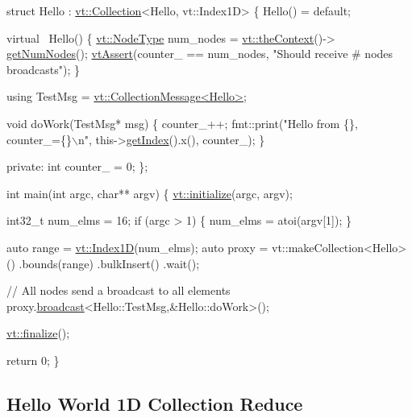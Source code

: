 \begin{DoxyCodeInclude}
\textcolor{keyword}{struct }Hello : \hyperlink{structvt_1_1vrt_1_1collection_1_1_collection}{vt::Collection}<Hello, vt::Index1D> \{
  Hello() = \textcolor{keywordflow}{default};

  \textcolor{keyword}{virtual} ~Hello() \{
    \hyperlink{namespacevt_a866da9d0efc19c0a1ce79e9e492f47e2}{vt::NodeType} num\_nodes = \hyperlink{namespacevt_a26551fe0e6e6a1371111df5b12c7e92c}{vt::theContext}()->
      \hyperlink{structvt_1_1ctx_1_1_context_a7f41071aadf6d5fa9e1b6c703c5ff19d}{getNumNodes}();
    \hyperlink{config__assert_8h_aeddd4990a496e91a0ca5d6c16437359b}{vtAssert}(counter\_ == num\_nodes, \textcolor{stringliteral}{"Should receive # nodes broadcasts"});
  \}

  \textcolor{keyword}{using} TestMsg = \hyperlink{structvt_1_1vrt_1_1collection_1_1_collection_message}{vt::CollectionMessage<Hello>};

  \textcolor{keywordtype}{void} doWork(TestMsg* msg) \{
    counter\_++;
    fmt::print(\textcolor{stringliteral}{"Hello from \{\}, counter\_=\{\}\(\backslash\)n"}, this->\hyperlink{structvt_1_1vrt_1_1collection_1_1_indexable_a28d05f23e7a20e12e94b8235305c1e82}{getIndex}().x(), counter\_);
  \}

\textcolor{keyword}{private}:
  \textcolor{keywordtype}{int} counter\_ = 0;
\};

\textcolor{keywordtype}{int} main(\textcolor{keywordtype}{int} argc, \textcolor{keywordtype}{char}** argv) \{
  \hyperlink{namespacevt_aae6ab5af3e11886ce73c4c3ffa008201}{vt::initialize}(argc, argv);

  int32\_t num\_elms = 16;
  \textcolor{keywordflow}{if} (argc > 1) \{
    num\_elms = atoi(argv[1]);
  \}

  \textcolor{keyword}{auto} range = \hyperlink{namespacevt_a5540efc78234273e1796fb003fe4d234}{vt::Index1D}(num\_elms);
  \textcolor{keyword}{auto} proxy = vt::makeCollection<Hello>()
    .bounds(range)
    .bulkInsert()
    .wait();

  \textcolor{comment}{// All nodes send a broadcast to all elements}
  proxy.\hyperlink{structvt_1_1objgroup_1_1proxy_1_1_proxy_a0b716ca776b1f06e0d7d45afbe9e5274}{broadcast}<Hello::TestMsg,&Hello::doWork>();

  \hyperlink{namespacevt_a540d90dbd6e97b69f1dcbc9ee9314cff}{vt::finalize}();

  \textcolor{keywordflow}{return} 0;
\}
\end{DoxyCodeInclude}
 \hypertarget{collection_reduce-hello-world-collection}{}\subsection{Hello World 1\+D Collection Reduce}\label{collection_reduce-hello-world-collection}

